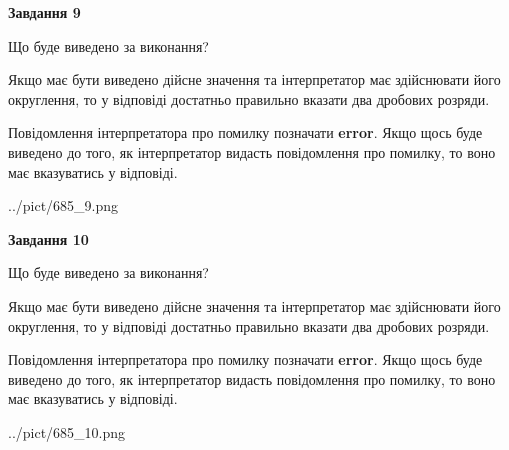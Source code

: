 \documentclass[12pt, ukrainian]{article}
\begin{document}
{\begin {Large}
{\begin {center}\textbf{Завдання 9}\end {center}}\par
Що буде виведено за виконання? \par

Якщо має бути виведено дійсне значення та інтерпретатор має здійснювати його округлення, 
то у відповіді достатньо правильно вказати два дробових розряди.

Повідомлення інтерпретатора про помилку позначати \textbf{error}.
Якщо щось буде виведено до того, як інтерпретатор видасть повідомлення про помилку, 
то воно має вказуватись у відповіді. \par

\begin{center}
	{../pict/685_9.png}
\end{center}
\newpage

{\begin {center}\textbf{Завдання 10}\end {center}}\par
Що буде виведено за виконання? \par

Якщо має бути виведено дійсне значення та інтерпретатор має здійснювати його округлення, 
то у відповіді достатньо правильно вказати два дробових розряди.

Повідомлення інтерпретатора про помилку позначати \textbf{error}.
Якщо щось буде виведено до того, як інтерпретатор видасть повідомлення про помилку, 
то воно має вказуватись у відповіді. \par

\begin{center}
	{../pict/685_10.png}
\end{center}
\newpage

\end {Large}}
\end{document}
